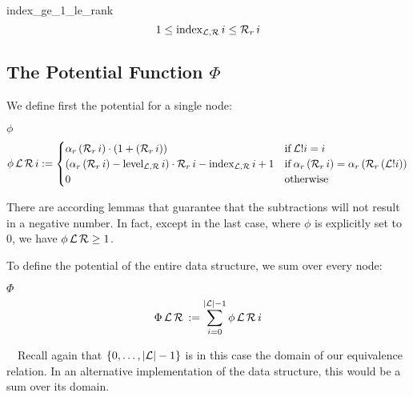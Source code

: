 \documentclass[headsepline,footsepline,footinclude=false,oneside,fontsize=11pt,paper=a4,listof=totoc,bibliography=totoc]{scrbook} %
\begin{document}
\begin{lemma}{index\_ge\_1\_le\_rank}
\begin{equation}
	1 \leq \mathrm{index}_{\mathcal{L},\mathcal{R}}\, i \leq \mathcal{R}_r\, i
\end{equation}
\end{lemma}

\subsection{The Potential Function $\Phi$}

We define first the potential for a single node:


\begin{definition}{$\phi$}
		\begin{equation*}
		\phi\, \mathcal{L}\, \mathcal{R}\, i :=
		\begin{cases}
		\alpha_r\, (\mathcal{R}_r\, i) \cdot (1 + (\mathcal{R}_r\, i)) & \mathrm{if}\, \mathcal{L}!i=i \,   \\
		 (\alpha_r\, (\mathcal{R}_r\, i) - \mathrm{level}_{\mathcal{L},\mathcal{R}}\, i) \cdot \mathcal{R}_r\, i - \mathrm{index}_{\mathcal{L},\mathcal{R}}\, i + 1  &\mathrm{if}\, \alpha_r\, (\mathcal{R}_r\, i) = \alpha_r\, (\mathcal{R}_r\, (\mathcal{L}!i))\\
		0 & \mathrm{otherwise}
		\end{cases}
		\end{equation*}
\end{definition}


There are according lemmas that guarantee that the subtractions will not result in a negative number. In fact, except in the last case, where $\phi$ is explicitly set to $0$, we have $\phi\, \mathcal{L}\, \mathcal{R} \geq 1$.

To define the potential of the entire data structure, we sum over every node:

\begin{definition}{$\Phi$}
	\begin{equation}
	\Phi\, \mathcal{L}\, \mathcal{R}\, :=  \sum_{i = 0}^{|\mathcal{L}| - 1}{\phi\, \mathcal{L}\, \mathcal{R}\, i}
	\end{equation}
	
\HandPencilLeft \, \, Recall again that $\{0,\dots, |\mathcal{L}|-1\}$ is in this case the domain of our equivalence relation. In an alternative implementation of the data structure, this would be a sum over its domain.

\end{definition}
\end{document}
